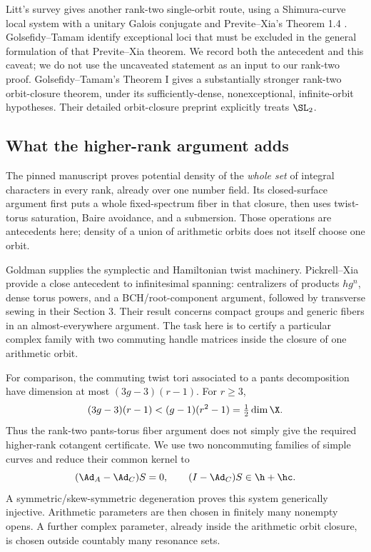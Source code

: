 Litt's survey \cite[Theorem 5.4.13]{Litt} gives another rank-two
single-orbit route, using a Shimura-curve local system with a unitary Galois
conjugate and Previte--Xia's Theorem 1.4 \cite{PreviteXia}.
Golsefidy--Tamam \cite[Section 3.3 and Theorems G--J]{GT}
identify exceptional loci that must be excluded in the general formulation
of that Previte--Xia theorem. We record both the antecedent and this caveat;
we do not use the uncaveated statement as an input to our rank-two proof.
Golsefidy--Tamam's Theorem I gives a substantially stronger rank-two
orbit-closure theorem, under its sufficiently-dense, nonexceptional,
infinite-orbit hypotheses. Their detailed orbit-closure preprint
\cite{GTpre} explicitly treats $\SL_2$.

\subsection{What the higher-rank argument adds}
The pinned manuscript \cite{Source027} proves potential density of the
\emph{whole set} of integral characters in every rank, already over one
number field. Its closed-surface argument first puts a whole fixed-spectrum
fiber in that closure, then uses twist-torus saturation, Baire avoidance,
and a submersion. Those operations are antecedents here; density of a union
of arithmetic orbits does not itself choose one orbit.

Goldman \cite{Goldman} supplies the symplectic and Hamiltonian twist
machinery. Pickrell--Xia \cite[Proposition 2.1.24 and Lemma 2.1.34]{PX}
provide a close antecedent to infinitesimal spanning: centralizers of
products $hg^n$, dense torus powers, and a BCH/root-component argument,
followed by transverse sewing in their Section 3. Their result concerns
compact groups and generic fibers in an almost-everywhere argument.
The task here is to certify a particular complex family with two commuting
handle matrices inside the closure of one arithmetic orbit.

For comparison, the commuting twist tori associated to a pants decomposition
have dimension at most $(3g-3)(r-1)$. For $r\geq3$,
\[
 (3g-3)(r-1)<(g-1)(r^2-1)=\tfrac12\dim\X.
\]
Thus the rank-two pants-torus fiber argument does not simply give the required
higher-rank cotangent certificate. We use two noncommuting families of simple
curves and reduce their common kernel to
\begin{equation}\label{eq:residual-intro}
 (\Ad_A-\Ad_C)S=0,\qquad (I-\Ad_C)S\in\h+\hc.
\end{equation}
A symmetric/skew-symmetric degeneration proves this system generically
injective. Arithmetic parameters are then chosen in finitely many nonempty
opens. A further complex parameter, already inside the arithmetic orbit
closure, is chosen outside countably many resonance sets.

